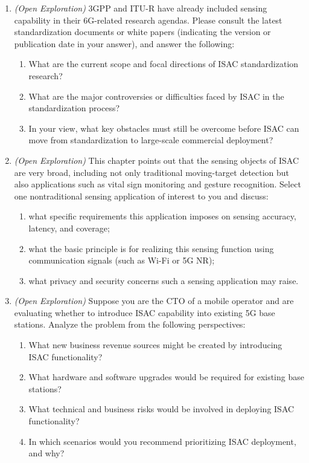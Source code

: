 \begin{enumerate}[label=\textbf{\arabic*.}, leftmargin=*]
    \item \textit{(Open Exploration)} 3GPP and ITU-R have already included sensing capability in their 6G-related research agendas. Please consult the latest standardization documents or white papers (indicating the version or publication date in your answer), and answer the following:
    \begin{enumerate}[label=(\alph*)]
        \item What are the current scope and focal directions of ISAC standardization research?
        \item What are the major controversies or difficulties faced by ISAC in the standardization process?
        \item In your view, what key obstacles must still be overcome before ISAC can move from standardization to large-scale commercial deployment?
    \end{enumerate}

    \item \textit{(Open Exploration)} This chapter points out that the sensing objects of ISAC are very broad, including not only traditional moving-target detection but also applications such as vital sign monitoring and gesture recognition. Select one nontraditional sensing application of interest to you and discuss:
    \begin{enumerate}[label=(\alph*)]
        \item what specific requirements this application imposes on sensing accuracy, latency, and coverage;
        \item what the basic principle is for realizing this sensing function using communication signals (such as Wi-Fi or 5G NR);
        \item what privacy and security concerns such a sensing application may raise.
    \end{enumerate}

    \item \textit{(Open Exploration)} Suppose you are the CTO of a mobile operator and are evaluating whether to introduce ISAC capability into existing 5G base stations. Analyze the problem from the following perspectives:
    \begin{enumerate}[label=(\alph*)]
        \item What new business revenue sources might be created by introducing ISAC functionality?
        \item What hardware and software upgrades would be required for existing base stations?
        \item What technical and business risks would be involved in deploying ISAC functionality?
        \item In which scenarios would you recommend prioritizing ISAC deployment, and why?
    \end{enumerate}

\end{enumerate}

